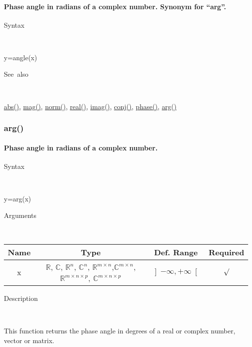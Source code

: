 \paragraph{\label{par:angle}Phase angle in radians of a complex number. Synonym
for {}``arg''.}

\begin{description}
\item [Syntax]~
\end{description}
y=angle(x)

\begin{description}
\item [See~also]~
\end{description}
\textcolor{blue}{\hyperlink{abs}{abs()}}, \textcolor{blue}{\hyperlink{mag}{mag()}},
\textcolor{blue}{\hyperlink{norm}{norm()}}, \textcolor{blue}{\hyperlink{real}{real()}},
\textcolor{blue}{\hyperlink{imag}{imag()}}, \textcolor{blue}{\hyperlink{conj}{conj()}},
\textcolor{blue}{\hyperlink{phase}{phase()}}, \textcolor{blue}{\hyperlink{arg}{arg()}}


\newpage
\subsubsection*{\hypertarget{arg}{}{\Large arg()}}


\paragraph{\label{par:arg}Phase angle in radians of a complex number.}

\begin{description}
\item [Syntax]~
\end{description}
y=arg(x)

\begin{description}
\item [Arguments]~
\end{description}
\begin{tabular}{|c|c|c|c|}
\hline 
Name&
Type&
Def. Range&
Required\tabularnewline
\hline
\hline 
x&
$\mathbb{R}$, $\mathbb{C}$, $\mathbb{R}^{n}$, $\mathbb{C}^{n}$,
$\mathbb{\mathbb{R}}^{m\times n}$,$\mathbb{\mathbb{C}}^{m\times n}$,
$\mathbb{\mathbb{R}}^{m\times n\times p}$, $\mathbb{\mathbb{C}}^{m\times n\times p}$ &
$\left]-\infty,+\infty\right[$&
$\surd$\tabularnewline
\hline
\end{tabular}

\begin{description}
\item [Description]~
\end{description}
This function returns the phase angle in degrees of a real or complex
number, vector or matrix.

